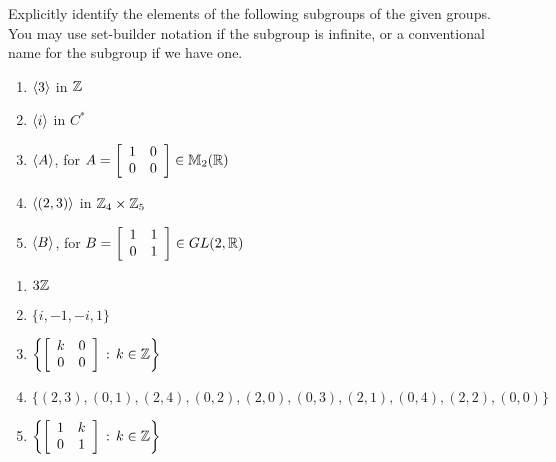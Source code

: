 \begin{exercise}
Explicitly identify the elements of the following subgroups of the given groups. You may use set-builder notation if the subgroup is infinite, or a conventional name for the subgroup if we have one.

\begin{enumerate}
\item $\langle3\rangle$ in $\mathbb{Z}$
\item $\langle i\rangle$ in $C^*$
\item $\langle A\rangle$, for $A=\left[ \begin{array}{cc}
                          1 & 0 \\
                          0 & 0 \\
                        \end{array}
                      \right]\in \mathbb{M}_2(\mathbb{R})$
\item $\langle(2,3)\rangle$ in $\mathbb{Z}_4\times \mathbb{Z}_5$
\item $\langle B\rangle$, for $B=\left[ \begin{array}{cc}
                          1 & 1\\
                          0 & 1 \\
                        \end{array}
                      \right]\in GL(2,\mathbb{R})$
\end{enumerate}

\end{exercise}


\begin{solution}[print=true]

\begin{enumerate}
\item $3\mathbb{Z}$
\item $\{i,-1,-i,1\}$
\item $\left\{\left[
                \begin{array}{cc}
                  k & 0 \\
                  0 & 0 \\
                \end{array}
              \right]\,:\,k\in \mathbb{Z}
\right\}$
\item $\{(2,3),(0,1),(2,4),(0,2),(2,0),(0,3),(2,1),(0,4),(2,2),(0,0)\}$
\item $\left\{\left[
                \begin{array}{cc}
                  1 & k \\
                  0 & 1 \\
                \end{array}
              \right]\,:\,k\in \mathbb{Z}\right\}$
\end{enumerate}

\end{solution}

